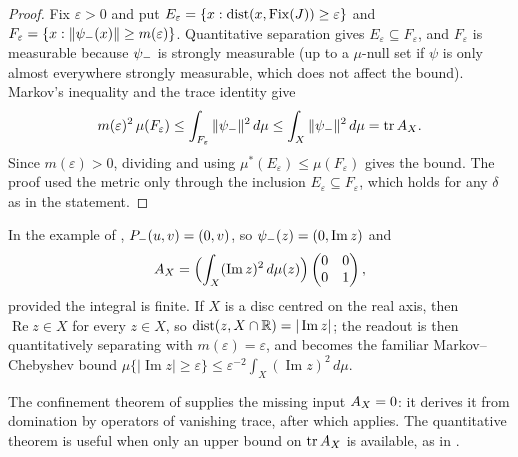 \begin{proof}
Fix \(\varepsilon>0\) and put
\(E_\varepsilon=\{x:\operatorname{dist}(x,\operatorname{Fix}(J))\geq\varepsilon\}\) and
\(F_\varepsilon=\{x:\|\psi_{-}(x)\|\geq m(\varepsilon)\}\).  Quantitative
separation gives \(E_\varepsilon\subseteq F_\varepsilon\), and
\(F_\varepsilon\) is measurable because \(\psi_{-}\) is strongly
measurable (up to a \(\mu\)-null set if \(\psi\) is only almost
everywhere strongly measurable, which does not affect the bound).  Markov's inequality \citep{Folland1999} and
the trace identity give
\[
  m(\varepsilon)^2\,\mu(F_\varepsilon)
  \leq\int_{F_\varepsilon}\|\psi_{-}\|^2\,d\mu
  \leq\int_X\|\psi_{-}\|^2\,d\mu=\operatorname{tr}A_{X} .
\]
Since \(m(\varepsilon)>0\), dividing and using
\(\mu^*(E_\varepsilon)\leq\mu(F_\varepsilon)\) gives the bound.  The
proof used the metric only through the inclusion
\(E_\varepsilon\subseteq F_\varepsilon\), which holds for any
\(\delta\) as in the statement.
\end{proof}

\begin{example}
In the example of ,
\(P_{-}(u,v)=(0,v)\), so \(\psi_{-}(z)=(0,\operatorname{Im}z)\) and
\[
  A_{X}=\Bigl(\int_X(\operatorname{Im}z)^2\,d\mu(z)\Bigr)
  \begin{pmatrix}0&0\\0&1\end{pmatrix},
\]
provided the integral is finite.  If \(X\) is a disc centred on the
real axis, then \(\operatorname{Re}z\in X\) for every \(z\in X\), so
\(\operatorname{dist}(z,X\cap\mathbb R)=|\operatorname{Im}z|\); the readout is then
quantitatively separating with \(m(\varepsilon)=\varepsilon\), and
 becomes the
familiar Markov--Chebyshev bound
\(\mu\{|\operatorname{Im}z|\geq\varepsilon\}\leq
\varepsilon^{-2}\int_X(\operatorname{Im}z)^2\,d\mu\).
\end{example}

The confinement theorem of  supplies the
missing input \(A_{X}=0\): it derives it from domination by operators of
vanishing trace, after which
 applies.  The
quantitative theorem is useful when only an upper bound on
\(\operatorname{tr}A_{X}\) is available, as in
.
